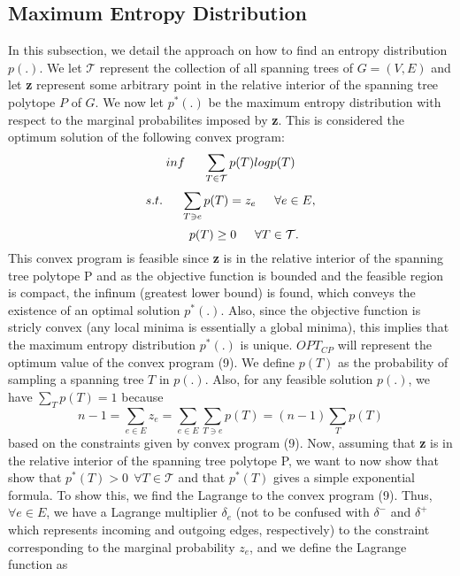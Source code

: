 \documentclass[oneside]{projectpaper} %
\begin{document}
\subsection{Maximum Entropy Distribution}
In this subsection, we detail the approach on how to find an entropy distribution $p(.)$. We let $\mathcal{T}$ represent the collection of all spanning trees of $G = (V, E)$ and let \textbf{z} represent some arbitrary point in the relative interior of the spanning tree polytope $P$ of $G$. We now let $p^*(.)$ be the maximum entropy distribution with respect to the marginal probabilites imposed by \textbf{z}. This is considered the optimum solution of the following convex program:
\begin{equation}
inf \indent \sum\limits_{T \in \mathcal{T}}p(T)logp(T)
\end{equation}
\begin{equation*}
s.t. \indent \sum\limits_{T \ni e}p(T) = z_e \indent \forall e \in E,
\end{equation*}
\begin{equation*}
\indent \ \ p(T) \geq 0 \indent \forall T \in \mathcal{T}.
\end{equation*}
This convex program is feasible since \textbf{z} is in the relative interior of the spanning tree polytope P and as the objective function is bounded and the feasible region is compact, the infinum (greatest lower bound) is found, which conveys the existence of an optimal solution $p^*(.)$. Also, since the objective function is stricly convex (any local minima is essentially a global minima), this implies that the maximum entropy distribution $p^*(.)$ is unique. $OPT_{CP}$ will represent the optimum value of the convex program (9). \newline
\indent We define $p(T)$ as the probability of sampling a spanning tree $T$ in $p(.)$. Also, for any feasible solution $p(.)$, we have $\sum\limits_{T}p(T) = 1$ because
\begin{equation*}
n - 1 = \sum\limits_{e \in E}z_e = \sum\limits_{e \in E}\sum\limits_{T \ni e}p(T) = (n - 1)\sum\limits_{T}p(T)
\end{equation*}
based on the constraints given by convex program (9). \newline
\indent Now, assuming that \textbf{z} is in the relative interior of the spanning tree polytope P, we want to now show that show that $p^*(T) > 0 \ \ \forall T \in \mathcal{T}$ and that $p^*(T)$ gives a simple exponential formula. To show this, we find the Lagrange to the convex program (9). Thus, $\forall e \in E$, we have a Lagrange multiplier $\delta_e$ (not to be confused with $\delta^-$ and $\delta^+$ which represents incoming and outgoing edges, respectively) to the constraint corresponding to the marginal probability $z_e$, and we define the Lagrange function as
\end{document}
